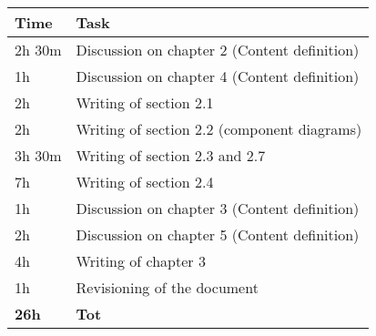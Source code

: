 \begin{center}
    {\renewcommand{\arraystretch}{2}%
    \begin{tabular}{L{2cm}L{12cm}}
        \hline
        \textbf{Time} & \textbf{Task} \\
        \hline
        2h 30m & Discussion on chapter 2 (Content definition) \\
        \hline
        1h & Discussion on chapter 4 (Content definition) \\
        \hline
        2h & Writing of section 2.1 \\
        \hline
        2h & Writing of section 2.2 (component diagrams) \\
        \hline
        3h 30m & Writing of section 2.3 and 2.7 \\
        \hline
        7h & Writing of section 2.4 \\
        \hline
        1h & Discussion on chapter 3 (Content definition) \\
        \hline
        2h & Discussion on chapter 5 (Content definition) \\
        \hline
        4h & Writing of chapter 3 \\
        \hline
        1h & Revisioning of the document \\
        \hline
        \textbf{26h} & \textbf{Tot} \\
    \end{tabular}}
\end{center}